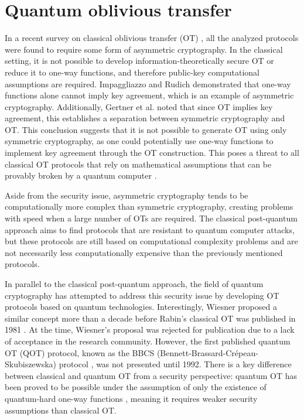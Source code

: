 


%

\chapter{Quantum oblivious transfer}
\label{chapter_QOT}


In a recent survey on classical oblivious transfer (OT) \cite{YAVV22}, all the analyzed protocols were found to require some form of asymmetric cryptography. In the classical setting, it is not possible to develop information-theoretically secure OT or reduce it to one-way functions, and therefore public-key computational assumptions are required. Impaggliazzo and Rudich \cite{IR89} demonstrated that one-way functions alone cannot imply key agreement, which is an example of asymmetric cryptography. Additionally, Gertner et al. \cite{GKMRV00} noted that since OT implies key agreement, this establishes a separation between symmetric cryptography and OT. This conclusion suggests that it is not possible to generate OT using only symmetric cryptography, as one could potentially use one-way functions to implement key agreement through the OT construction. This poses a threat to all classical OT protocols \cite{EGL85, NP01, CO15} that rely on mathematical assumptions that can be provably broken by a quantum computer \cite{Sho95}.

Aside from the security issue, asymmetric cryptography tends to be computationally more complex than symmetric cryptography, creating problems with speed when a large number of OTs are required. The classical post-quantum approach aims to find protocols that are resistant to quantum computer attacks, but these protocols are still based on computational complexity problems and are not necessarily less computationally expensive than the previously mentioned protocols.

In parallel to the classical post-quantum approach, the field of quantum cryptography has attempted to address this security issue by developing OT protocols based on quantum technologies. Interestingly, Wiesner proposed a similar concept more than a decade before Rabin's classical OT was published in 1981 \cite{Rabin81}. At the time, Wiesner's proposal was rejected for publication due to a lack of acceptance in the research community. However, the first published quantum OT (QOT) protocol, known as the BBCS (Bennett-Brassard-Cr{\'e}peau-Skubiszewska) protocol \cite{BBCS92}, was not presented until 1992. There is a key difference between classical and quantum OT from a security perspective: quantum OT has been proved to be possible under the assumption of only the existence of quantum-hard one-way functions \cite{GLSV21, BCKM21}, meaning it requires weaker security assumptions than classical OT.

